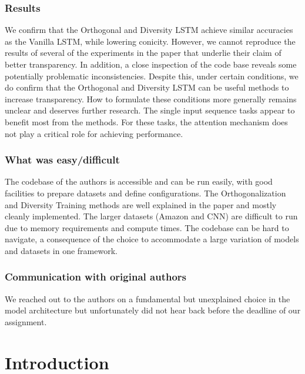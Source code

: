 \subsubsection{Results}We confirm that the Orthogonal and Diversity LSTM achieve similar accuracies as the Vanilla LSTM, while lowering conicity. However, we cannot reproduce the results of several of the experiments in the paper that underlie their claim of better transparency. In addition, a close inspection of the code base reveals some potentially problematic inconsistencies. Despite this, under certain conditions, we do confirm that the Orthogonal and Diversity LSTM can be useful methods to increase transparency. 
How to formulate these conditions more generally remains unclear and deserves further research.
The single input sequence tasks appear to benefit most from the methods. For these tasks, the attention mechanism does not play a critical role for achieving performance. 

\subsubsection{What was easy/difficult}
The codebase of the authors is accessible and can be run easily, with good facilities to prepare datasets and define configurations. The Orthogonalization and Diversity Training methods are well explained in the paper and mostly cleanly implemented. The larger datasets (Amazon and CNN) are difficult to run due to memory requirements and compute times. The codebase can be hard to navigate, a consequence of the choice to accommodate a large variation of models and datasets in one framework.

\subsubsection{Communication with original authors} We reached out to the authors on a fundamental but unexplained choice in the model architecture but unfortunately did not hear back before the deadline of our assignment.

\newpage

\section{Introduction}

